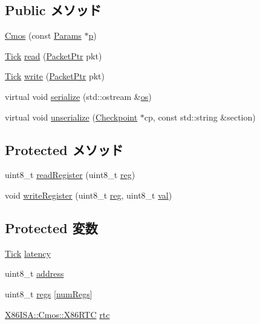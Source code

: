 \subsection*{Public メソッド}
\begin{DoxyCompactItemize}
\item 
\hyperlink{classX86ISA_1_1Cmos_a7ecd69b26388cf0408175e7cde6de621}{Cmos} (const \hyperlink{classX86ISA_1_1Cmos_a22dfc4a3fb18df74d309b9996cd9943c}{Params} $\ast$\hyperlink{namespaceX86ISA_af675c1d542a25b96e11164b80809a856}{p})
\item 
\hyperlink{base_2types_8hh_a5c8ed81b7d238c9083e1037ba6d61643}{Tick} \hyperlink{classX86ISA_1_1Cmos_a613ec7d5e1ec64f8d21fec78ae8e568e}{read} (\hyperlink{classPacket}{PacketPtr} pkt)
\item 
\hyperlink{base_2types_8hh_a5c8ed81b7d238c9083e1037ba6d61643}{Tick} \hyperlink{classX86ISA_1_1Cmos_a4cefab464e72b5dd42c003a0a4341802}{write} (\hyperlink{classPacket}{PacketPtr} pkt)
\item 
virtual void \hyperlink{classX86ISA_1_1Cmos_a53e036786d17361be4c7320d39c99b84}{serialize} (std::ostream \&\hyperlink{namespaceX86ISA_a6b6e6ba763e7eaf46ac5b6372ca98d30}{os})
\item 
virtual void \hyperlink{classX86ISA_1_1Cmos_af22e5d6d660b97db37003ac61ac4ee49}{unserialize} (\hyperlink{classCheckpoint}{Checkpoint} $\ast$cp, const std::string \&section)
\end{DoxyCompactItemize}
\subsection*{Protected メソッド}
\begin{DoxyCompactItemize}
\item 
uint8\_\-t \hyperlink{classX86ISA_1_1Cmos_aa6db46255cb370c4b02a204daefb40c2}{readRegister} (uint8\_\-t \hyperlink{namespaceX86ISA_aeeb02ad833ab76f3430553ef93213a6b}{reg})
\item 
void \hyperlink{classX86ISA_1_1Cmos_aad1a7f357917d79e46039f8a7875055a}{writeRegister} (uint8\_\-t \hyperlink{namespaceX86ISA_aeeb02ad833ab76f3430553ef93213a6b}{reg}, uint8\_\-t \hyperlink{namespaceX86ISA_ae13bf1250853ff6b72aabe3c79b587cc}{val})
\end{DoxyCompactItemize}
\subsection*{Protected 変数}
\begin{DoxyCompactItemize}
\item 
\hyperlink{base_2types_8hh_a5c8ed81b7d238c9083e1037ba6d61643}{Tick} \hyperlink{classX86ISA_1_1Cmos_ac8d8966078cc047949fd1bca8feb21b6}{latency}
\item 
uint8\_\-t \hyperlink{classX86ISA_1_1Cmos_af3f726014b044194def151079f1f2d89}{address}
\item 
uint8\_\-t \hyperlink{classX86ISA_1_1Cmos_a4d417c6dbc62e1223649ce26f948735f}{regs} \mbox{[}\hyperlink{classX86ISA_1_1Cmos_a443de50008cc375e38503522f5f3cf02}{numRegs}\mbox{]}
\item 
\hyperlink{classX86ISA_1_1Cmos_1_1X86RTC}{X86ISA::Cmos::X86RTC} \hyperlink{classX86ISA_1_1Cmos_a9ad248cc4414fc5e93d51266f7461e7d}{rtc}
\end{DoxyCompactItemize}
